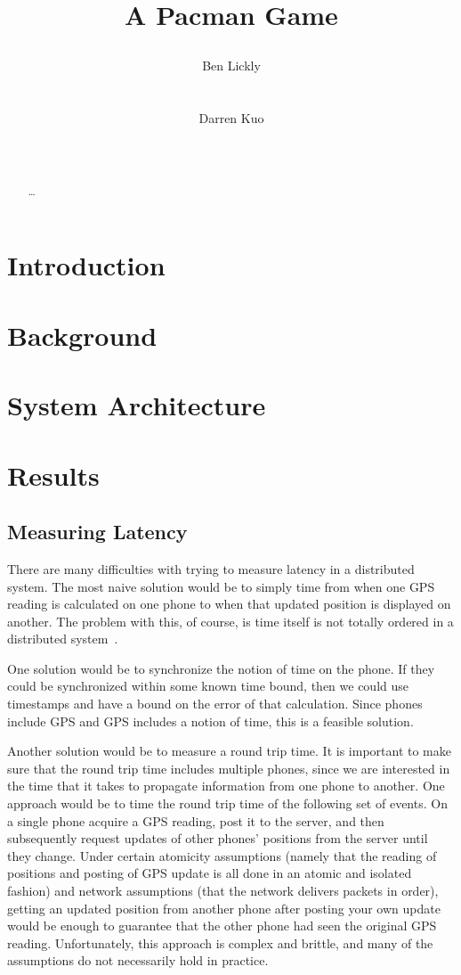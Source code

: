 \documentclass{acm_proc_article-sp}
\title{A Pacman Game
\numberofauthors{2}
\author{
\alignauthor Ben Lickly \\
       \affaddr{University of California, Berkeley}\\
       \affaddr{Berkeley, CA, USA} \\
       \email{blickly@eecs.berkeley.edu}
\alignauthor Darren Kuo \\
       \affaddr{University of California, Berkeley}\\
       \affaddr{Berkeley, CA, USA} \\
       \email{darrenkuo@eecs.berkeley.edu}
}
}
\begin{document}
\maketitle

\begin{abstract}
\ldots
\cite{ZombieRun}
\end{abstract}

\section{Introduction}
\section{Background}
\section{System Architecture}
\section{Results}
\subsection{Measuring Latency}
There are many difficulties with trying to measure latency in a distributed system.  The most naive solution would be to simply time from when one GPS reading is calculated on one phone to when that updated position is displayed on another. The problem with this, of course, is time itself is not totally ordered in a distributed system~\cite{Lamport:1978:TCO}.

One solution would be to synchronize the notion of time on the phone.  If they could be synchronized within some known time bound, then we could use timestamps and have a bound on the error of that calculation.  Since phones include GPS and GPS includes a notion of time, this is a feasible solution.

Another solution would be to measure a round trip time.  It is important to make sure that the round trip time includes multiple phones, since we are interested in the time that it takes to propagate information from one phone to another.  One approach would be to time the round trip time of the following set of events.  On a single phone acquire a GPS reading, post it to the server, and then subsequently request updates of other phones' positions from the server until they change.  Under certain atomicity assumptions (namely that the reading of positions and posting of GPS update is all done in an atomic and isolated fashion) and network assumptions (that the network delivers packets in order), getting an updated position from another phone after posting your own update would be enough to guarantee that the other phone had seen the original GPS reading.  Unfortunately, this approach is complex and brittle, and many of the assumptions do not necessarily hold in practice.
\end{document}
